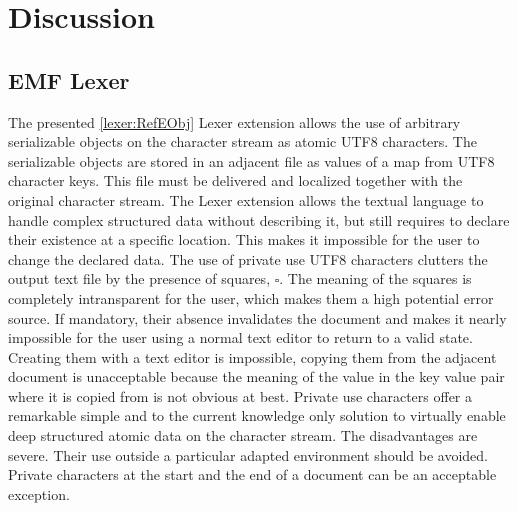 \chapter{Discussion}
%
\section{EMF Lexer} The presented \ref{lexer:RefEObj} Lexer extension allows the use of arbitrary serializable objects on the character stream as atomic UTF8 characters. The serializable objects are stored in an adjacent file as values of a map from UTF8 character keys. This file must be delivered and localized together with the original character stream. The Lexer extension allows the textual language to handle complex structured data without describing it, but still requires to declare their existence at a specific location. This makes it impossible for the user to change the declared data. The use of private use UTF8 characters clutters the output text file by the presence of squares, $\square$. The meaning of the squares is completely intransparent for the user, which makes them a high potential error source. If mandatory, their absence invalidates the document and makes it nearly impossible for the user using a normal text editor to return to a valid state. Creating them with a text editor is impossible, copying them from the adjacent document is unacceptable because the meaning of the value in the key value pair where it is copied from is not obvious at best. Private use characters offer a remarkable simple and to the current knowledge only solution to virtually enable deep structured atomic data on the character stream. The disadvantages are severe. Their use outside a particular adapted environment should be avoided. Private characters at the start and the end of a document can be an acceptable exception. 

